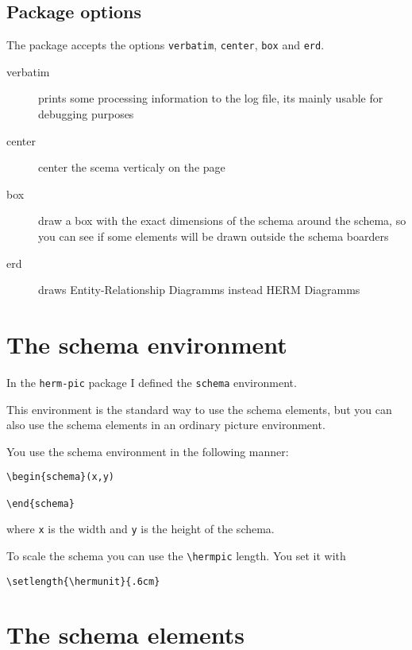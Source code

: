 \documentclass[a4paper,11pt]{article}
\begin{document}
\subsection{Package options}

The package accepts the options {\tt verbatim}, {\tt center}, {\tt box} and {\tt erd}.

\begin{description}
\item[verbatim] prints some processing information to the log file, its mainly 
  usable for debugging purposes
\item[center] center the scema verticaly on the page
\item[box] draw a box with the exact dimensions of the schema around the schema, so you
  can see if some elements will be drawn outside the schema boarders
\item[erd] draws Entity-Relationship Diagramms instead HERM Diagramms
\end{description}

\section{The schema environment}

In the {\tt herm-pic} package I defined the {\tt schema} environment.

This environment is the standard way to use the schema elements, but you 
can also use the schema elements in an ordinary picture environment.

You use the schema environment in the following manner:

\begin{verbatim}
\begin{schema}(x,y)

\end{schema}
\end{verbatim}

where {\tt x} is the width and {\tt y} is the height of 
the schema.

To scale the schema you can use the \verb|\hermpic| length.
You set it with

\begin{verbatim}
\setlength{\hermunit}{.6cm}
\end{verbatim}

\section{The schema elements}
\end{document}
